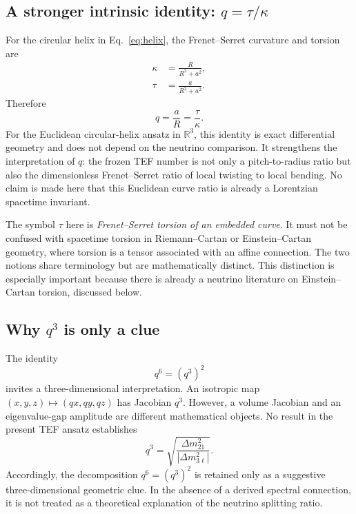 \documentclass[10pt,twocolumn]{article}
\begin{document}
\subsection{A stronger intrinsic identity: \texorpdfstring{$q=\tau/\kappa$}{q=tau/kappa}}

For the circular helix in Eq.~\eqref{eq:helix}, the Frenet--Serret curvature and
torsion are
\begin{align}
\kappa
&=
\frac{R}{R^2+a^2},\\
\tau
&=
\frac{a}{R^2+a^2}.
\end{align}
Therefore
\begin{equation}
\boxed{
q
=
\frac{a}{R}
=
\frac{\tau}{\kappa}.
}
\label{eq:qtk}
\end{equation}
For the Euclidean circular-helix ansatz in $\mathbb R^3$, this identity is exact
differential geometry and does not depend on the neutrino comparison.  It
strengthens the interpretation of $q$: the frozen TEF number is not only a
pitch-to-radius ratio but also the dimensionless Frenet--Serret ratio of local
twisting to local bending.  No claim is made here that this Euclidean curve ratio
is already a Lorentzian spacetime invariant.

The symbol $\tau$ here is \emph{Frenet--Serret torsion of an embedded curve}.
It must not be confused with spacetime torsion in Riemann--Cartan or
Einstein--Cartan geometry, where torsion is a tensor associated with an affine
connection.  The two notions share terminology but are mathematically distinct.
This distinction is especially important because there is already a neutrino
literature on Einstein--Cartan torsion, discussed below.

\subsection{Why \texorpdfstring{$q^3$}{q3} is only a clue}

The identity
\begin{equation}
q^6=(q^3)^2
\end{equation}
invites a three-dimensional interpretation.  An isotropic map
$(x,y,z)\mapsto(qx,qy,qz)$ has Jacobian $q^3$.  However, a volume Jacobian and an
eigenvalue-gap amplitude are different mathematical objects.  No result in the
present TEF ansatz establishes
\begin{equation}
q^3
=
\sqrt{\frac{\Delta m^2_{21}}{|\Delta m^2_{3\ell}|}}.
\end{equation}
Accordingly, the decomposition $q^6=(q^3)^2$ is retained only as a suggestive
three-dimensional geometric clue.  In the absence of a derived spectral
connection, it is not treated as a theoretical explanation of the neutrino
splitting ratio.
\end{document}
